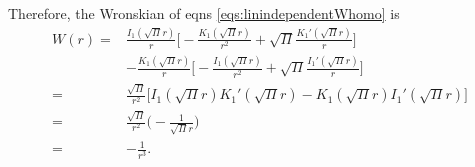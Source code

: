 \documentclass[twocolumn,amsmath,amssymb,aps]{revtex4-1}%
\begin{document}
Therefore, the Wronskian of eqns \ref{eqs:linindependentWhomo} is
\begin{align}\label{eq:wronskian}
  W(r)=
  & \frac{I_1(\sqrt{\Pi}r)}{r}\bigg[-\frac{K_1(\sqrt{\Pi}r)}{r^2}
    +\sqrt{\Pi}\frac{K_1'(\sqrt{\Pi}r)}{r}\bigg]\nonumber\\
  &-\frac{K_1(\sqrt{\Pi}r)}{r}\bigg[-\frac{I_1(\sqrt{\Pi}r)}{r^2}
    +\sqrt{\Pi}\frac{I_1'(\sqrt{\Pi}r)}{r}\bigg]\nonumber\\
  =& \frac{\sqrt{\Pi}}{r^2}\bigg[I_1(\sqrt{\Pi}r)K_1'(\sqrt{\Pi}r)
     - K_1(\sqrt{\Pi}r)I_1'(\sqrt{\Pi}r)\bigg]\nonumber\\
  =& \frac{\sqrt{\Pi}}{r^2}\bigg(-\frac{1}{\sqrt{\Pi}r}\bigg)\nonumber\\
  =& -\frac{1}{r^3}.
\end{align}

     
     


\end{document}
